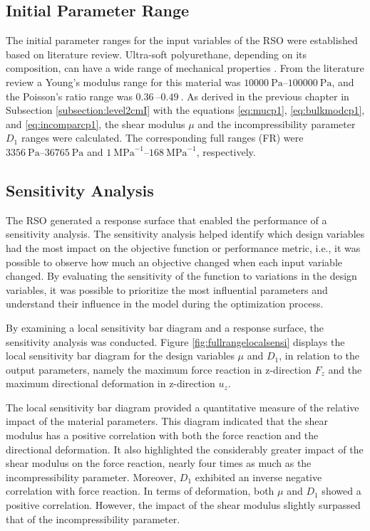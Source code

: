 \subsection*{Initial Parameter Range}
The initial parameter ranges for the input variables of the RSO were established based on literature review.
Ultra-soft polyurethane, depending on its composition, can have a wide range of mechanical properties \cite{Wendels2021}.
From the literature review a Young's modulus range for this material was $\SIrange{10000}{100000}{\pascal}$, and the 
Poisson's ratio range was $\SIrange{0.36}{0.49}{}$. As derived in the previous chapter in 
Subsection \ref{subsection:level2cmI} with the equations \ref{eq:mucp1}, \ref{eq:bulkmodcp1}, 
and \ref{eq:incomparcp1}, the shear modulus $\mu$ and the incompressibility parameter $D_1$ ranges were calculated.
The corresponding full ranges (FR) were $\SIrange{3356}{36765}{\pascal}$ and $\SIrange{1}{168}{\mega\pascal\tothe{-1}}$, respectively.

\subsection*{Sensitivity Analysis}
The RSO generated a response surface that enabled the performance of a sensitivity analysis.
The sensitivity analysis helped identify which design variables had the most impact 
on the objective function or performance metric, i.e., it was possible to observe how much 
an objective changed when each input variable changed. By evaluating the sensitivity of the 
function to variations in the design variables, it was possible to prioritize the most 
influential parameters and understand their influence in the model during the optimization 
process.

By examining a local sensitivity bar diagram and a response surface, the sensitivity analysis was conducted.
Figure \ref{fig:fullrangelocalsensi} displays the local sensitivity bar diagram for the design variables
$\mu$ and $D_1$, in relation to the output parameters, namely the maximum force reaction in z-direction $F_z$ 
and the maximum directional deformation in z-direction $u_z$. 

The local sensitivity bar diagram provided a quantitative measure of the relative impact of the material 
parameters. This diagram indicated that the shear modulus has a positive correlation with both the force
reaction and the directional deformation. It also highlighted the considerably greater impact of the shear modulus 
on the force reaction, nearly four times as much as the incompressibility parameter. Moreover, $D_1$ exhibited 
an inverse negative correlation with force reaction.
In terms of deformation, both $\mu$ and $D_1$ showed a positive correlation. However, the impact of the 
shear modulus slightly surpassed that of the incompressibility parameter.\\

